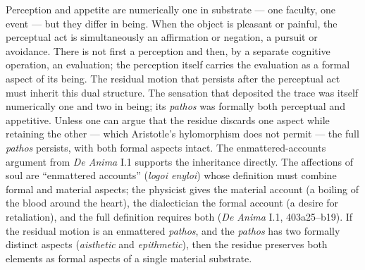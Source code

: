 \documentclass{article}
\begin{document}
Perception and appetite are numerically one in substrate --- one faculty, one event --- but they differ in being. When the object is pleasant or painful, the perceptual act is simultaneously an affirmation or negation, a pursuit or avoidance. There is not first a perception and then, by a separate cognitive operation, an evaluation; the perception itself carries the evaluation as a formal aspect of its being. The residual motion that persists after the perceptual act must inherit this dual structure. The sensation that deposited the trace was itself numerically one and two in being; its \textit{pathos} was formally both perceptual and appetitive. Unless one can argue that the residue discards one aspect while retaining the other --- which Aristotle's hylomorphism does not permit --- the full \textit{pathos} persists, with both formal aspects intact. The enmattered-accounts argument from \textit{De Anima} I.1 supports the inheritance directly. The affections of soul are ``enmattered accounts'' (\textit{logoi enyloi}) whose definition must combine formal and material aspects; the physicist gives the material account (a boiling of the blood around the heart), the dialectician the formal account (a desire for retaliation), and the full definition requires both (\textit{De Anima} I.1, 403a25--b19). If the residual motion is an enmattered \textit{pathos}, and the \textit{pathos} has two formally distinct aspects (\textit{aisthetic} and \textit{epithmetic}), then the residue preserves both elements as formal aspects of a single material substrate.
\end{document}
